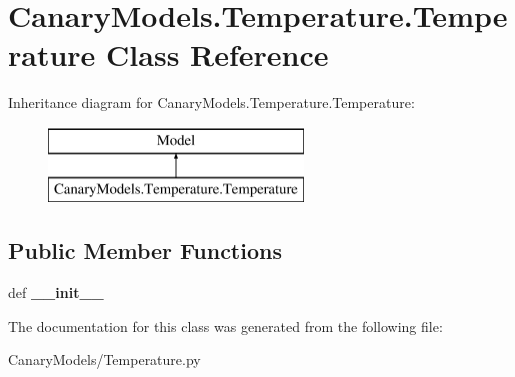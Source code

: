 \hypertarget{class_canary_models_1_1_temperature_1_1_temperature}{\section{Canary\-Models.\-Temperature.\-Temperature Class Reference}
\label{class_canary_models_1_1_temperature_1_1_temperature}
}
Inheritance diagram for Canary\-Models.\-Temperature.\-Temperature\-:\begin{figure}[H]
\begin{center}
\leavevmode
\includegraphics[height=2.000000cm]{class_canary_models_1_1_temperature_1_1_temperature}
\end{center}
\end{figure}
\subsection*{Public Member Functions}
\begin{DoxyCompactItemize}
\item 
\hypertarget{class_canary_models_1_1_temperature_1_1_temperature_a04dfdad3e16b916bd68850446510cdd2}{def {\bfseries \-\_\-\-\_\-init\-\_\-\-\_\-}}\label{class_canary_models_1_1_temperature_1_1_temperature_a04dfdad3e16b916bd68850446510cdd2}

\end{DoxyCompactItemize}


The documentation for this class was generated from the following file\-:\begin{DoxyCompactItemize}
\item 
Canary\-Models/Temperature.\-py\end{DoxyCompactItemize}
